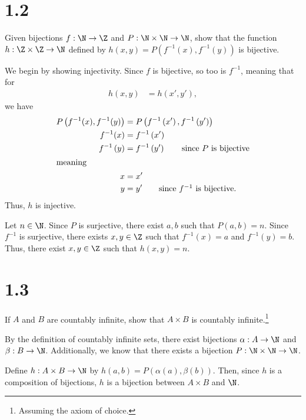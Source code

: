 \documentclass[10pt]{mypackage}
\begin{document}
\section{1.2}%
\begin{problem}
  Given bijections $f: \N\rightarrow \Z$ and $P: \N\times\N\rightarrow \N$, show that the function $h: \Z\times \Z \rightarrow \N$ defined by $h(x,y) = P\left(f^{-1}\left(x\right),f^{-1}\left(y\right)\right)$ is bijective.
\end{problem}
\begin{solution}
  We begin by showing injectivity. Since $f$ is bijective, so too is $f^{-1}$, meaning that for
  \begin{align*}
    h\left(x,y\right) &= h\left(x',y'\right),
  \end{align*}
  we have
  \begin{align*}
    P\left(f^{-1}(x),f^{-1}(y)\right) &= P\left(f^{-1}\left(x'\right),f^{-1}\left(y'\right)\right)\\
    f^{-1}(x) &= f^{-1}\left(x'\right)\\
    f^{-1}\left(y\right) &= f^{-1}\left(y'\right) \tag*{since $P$ is bijective}\\
    \intertext{meaning}
    x &= x'\\
    y &= y'\tag*{since $f^{-1}$ is bijective.}
  \end{align*}
  Thus, $h$ is injective.\newline

  Let $n\in \N$. Since $P$ is surjective, there exist $a,b$ such that $P\left(a,b\right) = n$. Since $f^{-1}$ is surjective, there exists $x,y\in \Z$ such that $f^{-1}\left(x\right) = a$ and $f^{-1}\left(y\right) = b$. Thus, there exist $x,y\in \Z$ such that $h\left(x,y\right) = n$.
\end{solution}
\section{1.3}%
\begin{problem}
  If $A$ and $B$ are countably infinite, show that $A\times B$ is countably infinite.\footnote{Assuming the axiom of choice.}
\end{problem}
\begin{solution}
  By the definition of countably infinite sets, there exist bijections $\alpha: A\rightarrow \N$ and $\beta: B\rightarrow \N$. Additionally, we know that there exists a bijection $P: \N\times \N \rightarrow \N$.\newline

  Define $h: A\times B \rightarrow \N$ by $h(a,b) = P\left(\alpha\left(a\right),\beta\left(b\right)\right)$. Then, since $h$ is a composition of bijections, $h$ is a bijection between $A\times B$ and $\N$.
\end{solution}
\end{document}
